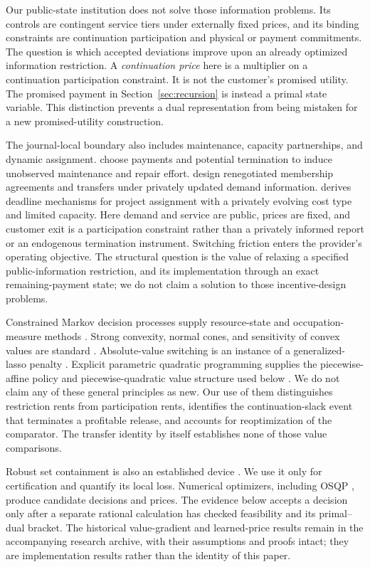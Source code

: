 \documentclass[11pt,letterpaper]{article}
\theoremstyle{definition}\newtheorem{assumption}[theorem]{Assumption}
\begin{document}
Our public-state institution does not solve those information problems. Its controls are contingent service tiers under externally fixed prices, and its binding constraints are continuation participation and physical or payment commitments. The question is which accepted deviations improve upon an already optimized information restriction. A \emph{continuation price} here is a multiplier on a continuation participation constraint. It is not the customer's promised utility. The promised payment in Section~\ref{sec:recursion} is instead a primal state variable. This distinction prevents a dual representation from being mistaken for a new promised-utility construction.

The journal-local boundary also includes maintenance, capacity partnerships, and dynamic assignment. \citet{TianSunDuenyas2021} choose payments and potential termination to induce unobserved maintenance and repair effort. \citet{LiuLewisSongKuribko2019} design renegotiated membership agreements and transfers under privately updated demand information. \citet{He2023} derives deadline mechanisms for project assignment with a privately evolving cost type and limited capacity. Here demand and service are public, prices are fixed, and customer exit is a participation constraint rather than a privately informed report or an endogenous termination instrument. Switching friction enters the provider's operating objective. The structural question is the value of relaxing a specified public-information restriction, and its implementation through an exact remaining-payment state; we do not claim a solution to those incentive-design problems.

Constrained Markov decision processes supply resource-state and occupation-measure methods \citep{Altman1999}. Strong convexity, normal cones, and sensitivity of convex values are standard \citep{BoydVandenberghe2004}. Absolute-value switching is an instance of a generalized-lasso penalty \citep{TibshiraniTaylor2011}. Explicit parametric quadratic programming supplies the piecewise-affine policy and piecewise-quadratic value structure used below \citep{Bemporad2002}. We do not claim any of these general principles as new. Our use of them distinguishes restriction rents from participation rents, identifies the continuation-slack event that terminates a profitable release, and accounts for reoptimization of the comparator. The transfer identity by itself establishes none of those value comparisons.

Robust set containment is also an established device \citep{BenTalNemirovski2000,BertsimasSim2004}. We use it only for certification and quantify its local loss. Numerical optimizers, including OSQP \citep{Stellato2020}, produce candidate decisions and prices. The evidence below accepts a decision only after a separate rational calculation has checked feasibility and its primal--dual bracket. The historical value-gradient and learned-price results remain in the accompanying research archive, with their assumptions and proofs intact; they are implementation results rather than the identity of this paper.
\end{document}
